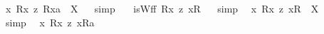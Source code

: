\begin{isabellebody}
{\isafoldproof}%
%
\isadelimproof
%
\endisadelimproof
\isanewline
{}\isamarkupfalse%
\ {\isachardoublequoteopen}{\isacharless}{\isasymlambda}x{\isachardot}\ {\isacharless}R{}{\isasymbullet}{\isachardot}x{\isachardot}{\isachargreater}\ {\isasymrightarrow}\isactrlsup z\ {\isacharless}R{}{\isasymbullet}{\isachardot}x{\isachardot}{\isachargreater}{\isacharparenright}{\isasymbullet}a{\isachargreater}\ {\isacharequal}\ X{\isachardoublequoteclose}%
\isadelimproof
\ %
\endisadelimproof
%
\isatagproof
{}\isamarkupfalse%
\ {\isacharparenleft}simp{\isacharparenright}\ \isamarkupfalse%
%
\endisatagproof
{\isafoldproof}%
%
\isadelimproof
%
\endisadelimproof
\isanewline
\isanewline
{}\isamarkupfalse%
\ {\isachardoublequoteopen}{\isasymnot}\ isWff\ {\isacharparenleft}{\isacharless}R{}{\isasymbullet}{\isachardot}x{\isachardot}{\isachargreater}\ {\isasymrightarrow}\isactrlsup z\ {\isacharless}{\isachardot}x{\isachardot}{\isasymcirc}R{}{\isachargreater}{\isacharparenright}{\isachardoublequoteclose}%
\isadelimproof
\ %
\endisadelimproof
%
\isatagproof
{}\isamarkupfalse%
\ {\isacharparenleft}simp{\isacharparenright}\ \isamarkupfalse%
%
\endisatagproof
{\isafoldproof}%
%
\isadelimproof
%
\endisadelimproof
\isanewline
{}\isamarkupfalse%
\ {\isachardoublequoteopen}{\isasymlambda}x{\isachardot}\ {\isacharless}R{}{\isasymbullet}{\isachardot}x{\isachardot}{\isachargreater}\ {\isasymrightarrow}\isactrlsup z\ {\isacharless}{\isachardot}x{\isachardot}{\isasymcirc}R{}{\isachargreater}{\isacharparenright}\ {\isacharequal}\ X{\isachardoublequoteclose}%
\isadelimproof
\ %
\endisadelimproof
%
\isatagproof
{}\isamarkupfalse%
\ {\isacharparenleft}simp{\isacharparenright}\ \isamarkupfalse%
%
\endisatagproof
{\isafoldproof}%
%
\isadelimproof
%
\endisadelimproof
\isanewline
\isanewline
{}\isamarkupfalse%
\ {\isachardoublequoteopen}{\isacharbrackleft}{\isacharless}{\isasymlambda}x{\isachardot}\ {\isacharless}R{}{\isasymbullet}{\isachardot}x{\isachardot}{\isachargreater}\ {\isasymrightarrow}\isactrlsup z\ {\isacharless}{\isachardot}x{\isachardot}{\isasymcirc}R{}{\isachargreater}{\isacharparenright}{\isasymbullet}a{\isachargreater}{\isacharbrackright}{\isachardoublequoteclose}%

\end{isabellebody}

